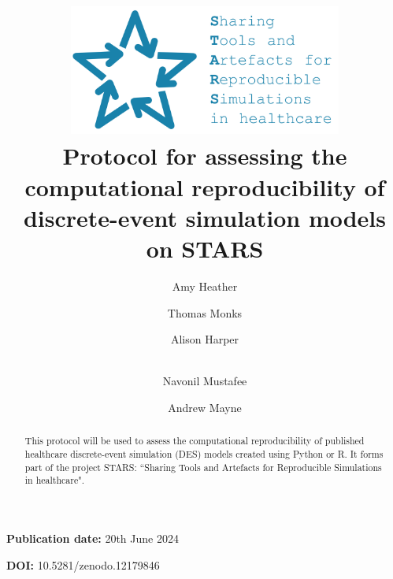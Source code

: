 \title{
    \vspace{-1.2cm}
    \includegraphics[width=9cm]{images/stars_logo_blue_text.png}\\[1cm]
    \textbf{Protocol for assessing the computational reproducibility of discrete-event simulation models on STARS}
}

\author[1]{ Amy Heather}
\author[1]{ Thomas Monks}
\author[2]{ Alison Harper}
\author[2]{\\  Navonil Mustafee}
\author[3]{ Andrew Mayne}


\date{}

\maketitle

\textbf{Publication date:} 20th June 2024

\textbf{DOI:} 10.5281/zenodo.12179846

\vspace{0.5cm}

\begin{shaded}
    \begin{abstract}
        This protocol will be used to assess the computational reproducibility of published healthcare discrete-event simulation (DES) models created using Python or R. It forms part of the project STARS: ``Sharing Tools and Artefacts for Reproducible Simulations in healthcare".
    \end{abstract}
\end{shaded}

